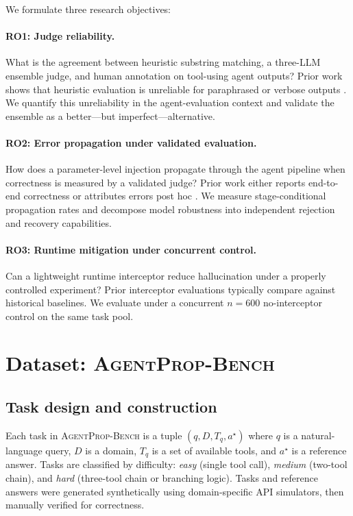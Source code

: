 \documentclass[preprint,review,12pt,3p]{elsarticle}
\newcommand{\bench}{\textsc{AgentProp-Bench}\xspace}
\begin{document}
We formulate three research objectives:

\paragraph{RO1: Judge reliability.}
What is the agreement between heuristic substring matching, a
three-LLM ensemble judge, and human annotation on tool-using agent
outputs?
Prior work shows that heuristic evaluation is unreliable for
paraphrased or verbose outputs \citep{soboroff2024dont}.
We quantify this unreliability in the agent-evaluation context and
validate the ensemble as a better---but imperfect---alternative.

\paragraph{RO2: Error propagation under validated evaluation.}
How does a parameter-level injection propagate through the agent
pipeline when correctness is measured by a validated judge?
Prior work either reports end-to-end correctness or attributes
errors post hoc \citep{liu2026agenthallu}.
We measure stage-conditional propagation rates and decompose model
robustness into independent rejection and recovery capabilities.

\paragraph{RO3: Runtime mitigation under concurrent control.}
Can a lightweight runtime interceptor reduce hallucination under a
properly controlled experiment?
Prior interceptor evaluations \citep{wang2026agentspec} typically
compare against historical baselines.
We evaluate under a concurrent $n{=}600$ no-interceptor control on
the same task pool.


\section{Dataset: \bench{}}
\label{sec:dataset}

\subsection{Task design and construction}

Each task in \bench{} is a tuple $(q, D, T_q, a^\star)$ where $q$ is a
natural-language query, $D$ is a domain, $T_q$ is a set of available
tools, and $a^\star$ is a reference answer.
Tasks are classified by difficulty: \emph{easy} (single tool call),
\emph{medium} (two-tool chain), and \emph{hard} (three-tool chain or
branching logic).
Tasks and reference answers were generated synthetically using
domain-specific API simulators, then manually verified for correctness.
\end{document}
